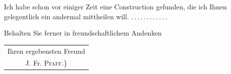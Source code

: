 \noindent\hspace*{\parindent}Ich habe schon vor einiger Zeit eine Construction gefunden,
die ich Ihnen gelegentlich ein andermal mittheilen will.
.\,.\,.\,.\,.\,.\,.\,.\,.\,.\,.\,.

Behalten Sie ferner in freundschaftlichem Andenken
\begin{flushright}\begin{tabular}{c}Ihren ergebensten Freund\\J. Fr. \textsc{Pfaff}.\}\end{tabular}\end{flushright}
